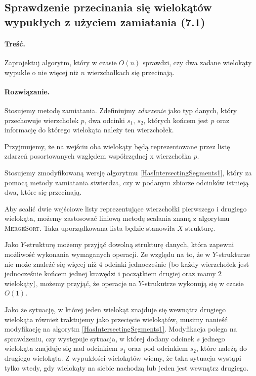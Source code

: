 
\subsection{Sprawdzenie przecinania się wielokątów wypukłych z użyciem zamiatania (7.1)} 
\paragraph{Treść.} Zaprojektuj algorytm, który w 
czasie $O(n)$ sprawdzi, czy dwa zadane wielokąty wypukłe o nie więcej
niż $n$ wierzchołkach się przecinają. 

\paragraph{Rozwiązanie.}
Stosujemy metodę zamiatania. Zdefiniujmy \textit{zdarzenie}
jako typ danych, który przechowuje wierzchołek $p$, dwa
odcinki $s_1$, $s_2$, których końcem jest $p$ oraz informację 
do którego wielokąta należy ten wierzchołek.

Przyjmujemy, że na wejściu oba wielokąty będą
reprezentowane przez listę zdarzeń posortowanych
względem współrzędnej x wierzchołka $p$. 

Stosujemy zmodyfikowaną wersję algorytmu \ref{HasIntersectingSegments1}, który za 
pomocą metody zamiatania stwierdza, czy w podanym
zbiorze odcinków istnieją dwa, które się przecinają.  

Aby scalić dwie wejściowe listy reprezentujące wierzchołki pierwszego
i drugiego wielokąta, możemy zastosować liniową metodę scalania
znaną z algorytmu \textsc{MergeSort}. Taka uporządkowana lista
będzie stanowiła $X$-strukturę.

Jako $Y$-strukturę możemy przyjąć dowolną strukturę danych, która
zapewni możliwość wykonania wymaganych operacji. Ze względu 
na to, że w $Y$-strukturze nie może znaleźć się więcej niż 
4 odcinki jednocześnie (bo każdy wierzchołek jest jednocześnie
końcem jednej krawędzi i początkiem drugiej oraz mamy 
2 wielokąty), możemy przyjąć, że operacje na $Y$-strukutrze wykonują się w czasie $O(1)$.

Jako że sytuację, w której jeden wielokąt znajduje się wewnątrz drugiego
wielokąta również traktujemy jako przecięcie wielokątów, musimy nanieść modyfikację
na algorytm \ref{HasIntersectingSegments1}. Modyfikacja polega na sprawdzeniu, 
czy występuje sytuacja, w której dodany odcinek $s$
jednego wielokąta znajduje się nad odcinkiem $s_1$ oraz pod odcinkiem $s_2$,
które należą do drugiego wielokąta. Z wypukłości wielokątów wiemy, że 
taka sytuacja wystąpi tylko wtedy, gdy wielokąty na siebie nachodzą lub
jeden jest wewnątrz drugiego.
 
